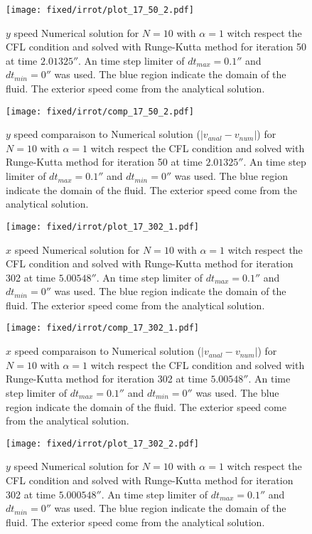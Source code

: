 \begin{figure}
\texttt{[image: fixed/irrot/plot\_17\_50\_2.pdf]}
\caption{$y$ speed Numerical solution for $N=10$ with $\alpha=1$ witch respect the CFL condition and solved with Runge-Kutta method
for iteration 50 at time $\unit{2.01325}{\second}$.
An time step limiter of $dt_{max}=\unit{0.1}{\second}$ and $dt_{min}=\unit{0}{\second}$ was used.
The blue region indicate the domain of the fluid. The exterior speed come from the analytical solution.
\label{fix:plot_17_50_2}
}
\end{figure}

\begin{figure}
\texttt{[image: fixed/irrot/comp\_17\_50\_2.pdf]}
\caption{$y$ speed comparaison to Numerical solution ($|v_{anal}-v_{num}|$) for $N=10$ with $\alpha=1$ witch respect the CFL condition and solved with Runge-Kutta method
for iteration 50 at time $\unit{2.01325}{\second}$.
An time step limiter of $dt_{max}=\unit{0.1}{\second}$ and $dt_{min}=\unit{0}{\second}$ was used.
The blue region indicate the domain of the fluid. The exterior speed come from the analytical solution.
\label{fix:comp_17_50_2}
}
\end{figure}

\begin{figure}
\texttt{[image: fixed/irrot/plot\_17\_302\_1.pdf]}
\caption{$x$ speed Numerical solution for $N=10$ with $\alpha=1$ witch respect the CFL condition and solved with Runge-Kutta method
for iteration 302 at time $\unit{5.00548}{\second}$.
An time step limiter of $dt_{max}=\unit{0.1}{\second}$ and $dt_{min}=\unit{0}{\second}$ was used.
The blue region indicate the domain of the fluid. The exterior speed come from the analytical solution.
\label{fix:plot_17_302_1}
}
\end{figure}

\begin{figure}
\texttt{[image: fixed/irrot/comp\_17\_302\_1.pdf]}
\caption{$x$ speed comparaison to Numerical solution ($|v_{anal}-v_{num}|$) for $N=10$ with $\alpha=1$ witch respect the CFL condition and solved with Runge-Kutta method
for iteration 302 at time $\unit{5.00548}{\second}$.
An time step limiter of $dt_{max}=\unit{0.1}{\second}$ and $dt_{min}=\unit{0}{\second}$ was used.
The blue region indicate the domain of the fluid. The exterior speed come from the analytical solution.
\label{fix:comp_17_302_1}
}
\end{figure}

\begin{figure}
\texttt{[image: fixed/irrot/plot\_17\_302\_2.pdf]}
\caption{$y$ speed Numerical solution for $N=10$ with $\alpha=1$ witch respect the CFL condition and solved with Runge-Kutta method
for iteration 302 at time $\unit{5.000548}{\second}$.
An time step limiter of $dt_{max}=\unit{0.1}{\second}$ and $dt_{min}=\unit{0}{\second}$ was used.
The blue region indicate the domain of the fluid. The exterior speed come from the analytical solution.
\label{fix:plot_17_302_2}
}
\end{figure}

